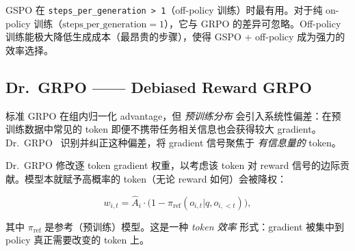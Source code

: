 \begin{warningbox}[何时使用 GSPO]
GSPO 在 \texttt{steps\_per\_generation > 1}（off-policy 训练）时最有用。对于纯 on-policy 训练（$\text{steps\_per\_generation}=1$），它与 GRPO 的差异可忽略。Off-policy 训练能极大降低生成成本（最昂贵的步骤），使得 GSPO + off-policy 成为强力的效率选择。
\end{warningbox}

\subsection{Dr.~GRPO —— Debiased Reward GRPO}
\label{sec:dr-grpo}

\begin{intuitionbox}[预训练偏差问题]
标准 GRPO 在组内归一化 advantage，但 \emph{预训练分布} 会引入系统性偏差：在预训练数据中常见的 token 即便不携带任务相关信息也会获得较大 gradient。Dr.~GRPO~\cite{liu2024drgrpo} 识别并纠正这种偏差，将 gradient 信号聚焦于 \emph{有信息量的} token。
\end{intuitionbox}

Dr.~GRPO 修改逐 token gradient 权重，以考虑该 token 对 reward 信号的边际贡献。模型本就赋予高概率的 token（无论 reward 如何）会被降权：

\[
w_{i,t} = \hat{A}_i \cdot \bigl(1 - \pi_{\text{ref}}(o_{i,t}|q,o_{i,<t})\bigr),
\]

其中 $\pi_{\text{ref}}$ 是参考（预训练）模型。这是一种 \emph{token 效率} 形式：gradient 被集中到 policy 真正需要改变的 token 上。

